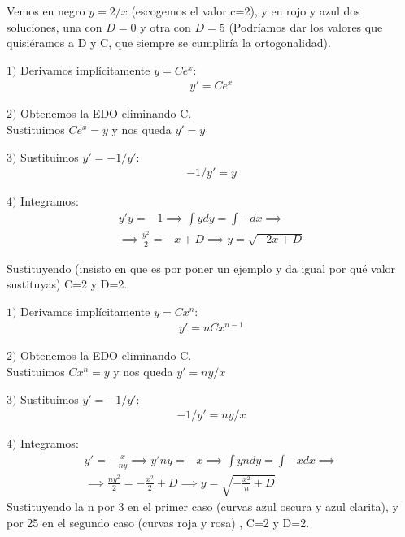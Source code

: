 \documentclass[nochap]{apuntes}
\begin{document}
\begin{problem}[8]
Vemos en negro $y=2/x$ (escogemos el valor c=2), y en rojo y azul dos soluciones, una con $D=0$ y otra con $D=5$ (Podríamos dar los valores que quisiéramos a D y C, que siempre se cumpliría la ortogonalidad).



\spart
$1)$ Derivamos implícitamente $y=Ce^x$:
\begin{gather*}
y'=Ce^x
\end{gather*}

$2)$ Obtenemos la EDO eliminando C.\\
Sustituimos $Ce^x=y$ y nos queda $y'=y$

$3)$ Sustituimos  $y'=-1/y'$:
\begin{gather*}
-1/y'=y
\end{gather*}

$4)$ Integramos:
\begin{gather*}
y'y=-1 \implies \int ydy=\int -dx \implies \\ \implies \frac{y^2}{2}=-x+D \implies y=\sqrt{-2x+D}
\end{gather*}

Sustituyendo (insisto en que es por poner un ejemplo y da igual por qué valor sustituyas) C=2 y D=2.
\newpage

\spart
$1)$ Derivamos implícitamente $y=Cx^n$:
\begin{gather*}
y'=nCx^{n-1}
\end{gather*}

$2)$ Obtenemos la EDO eliminando C.\\
Sustituimos $Cx^n=y$ y nos queda $y'=ny/x$

$3)$ Sustituimos  $y'=-1/y'$:
\begin{gather*}
-1/y'=ny/x
\end{gather*}

$4)$ Integramos:
\begin{gather*}
y'=-\frac{x}{ny} \implies y'ny=-x  \implies \int yndy=\int -xdx \implies \\ \implies \frac{ny^2}{2}=-\frac{x^2}{2}+D \implies y=\sqrt{-\frac{x^2}{n}+D}
\end{gather*}
Sustituyendo la n por 3 en el primer caso (curvas azul oscura y azul clarita), y por 25 en el segundo caso (curvas roja y rosa) , C=2 y D=2.
\end{problem}
\end{document}
